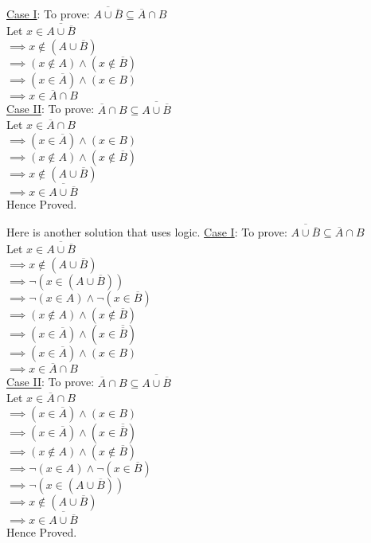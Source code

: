 \documentclass[addpoints]{exam}
\newcommand\inter\cap
\newcommand\ul\underline
\newcommand\ol\overline
\begin{document}
\begin{questions}
\begin{parts}
\begin{solution}
      \ul{Case I}: To prove: $\overline{ A \cup \overline{B}} \subseteq \overline{A} \cap B$\\
      Let $x \in \overline{ A \cup \overline{B}}$\\
      $\implies x \not\in (A \cup \overline{B})$\\
      $\implies (x \not\in A) \land (x \not\in \ol{B})$\\
      $\implies (x \in \ol{A}) \land (x \in B)$\\
      $\implies x \in \ol{A} \inter B$\\
      \ul{Case II}: To prove: $ \overline{A} \cap B \subseteq \overline{ A \cup \overline{B}}$\\
      Let $x \in \ol{A} \inter B$\\
      $\implies (x \in \ol{A}) \land (x \in B)$\\
      $\implies (x \not\in A) \land (x \not\in \ol{B})$\\
      $\implies x \not\in (A \cup \overline{B})$\\
      $\implies x \in \ol{A \cup \overline{B}}$\\[5pt]
      Hence Proved.
    \end{solution}
    \begin{solution} Here is another solution that uses logic.
      \ul{Case I}: To prove: $\overline{ A \cup \overline{B}} \subseteq \overline{A} \cap B$\\
      Let $x \in \overline{ A \cup \overline{B}}$\\
      $\implies x \not\in (A \cup \overline{B})$\\
       $\implies \neg (x \in (A \cup \overline{B}))$\\
       $\implies \neg (x \in A) \land  \neg (x \in \overline{B})$\\
      $\implies (x \not\in A) \land (x \not\in \ol{B})$\\
      $\implies (x \in \ol{A}) \land (x \in \ol{\ol{B}})$\\
      $\implies (x \in \ol{A}) \land (x \in B)$\\
      $\implies x \in \ol{A} \inter B$\\
      \ul{Case II}: To prove: $ \overline{A} \cap B \subseteq \overline{ A \cup \overline{B}}$\\
      Let $x \in \ol{A} \inter B$\\
      $\implies (x \in \ol{A}) \land (x \in B)$\\
        $\implies (x \in \ol{A}) \land (x \in \ol{\ol{B}})$\\
       $\implies (x \not\in A) \land (x \not\in \ol{B})$\\
       $\implies \neg (x \in A) \land  \neg (x \in \overline{B})$\\
        $\implies \neg (x \in (A \cup \overline{B}))$\\
      $\implies x \not\in (A \cup \overline{B})$\\
      $\implies x \in \ol{A \cup \overline{B}}$\\[5pt]
      Hence Proved.
    \end{solution}
  \end{parts}
\end{questions}
\end{document}
